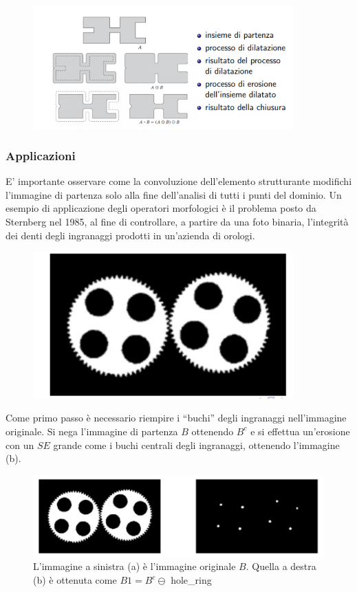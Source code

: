 \begin{figure}[H]
    \centering
    \includegraphics[width=10cm, keepaspectratio]{capitoli/immagini/imgs/chiusura_bella.png}
\end{figure}

\subsubsection{Applicazioni}

E' importante osservare come la convoluzione dell'elemento strutturante modifichi l'immagine di partenza solo alla fine
dell'analisi di tutti i punti del dominio. Un esempio di applicazione degli operatori morfologici è il problema posto da Sternberg nel 1985, al fine di controllare, a
partire da una foto binaria, l'integrità dei denti degli ingranaggi prodotti in un'azienda di orologi.

\begin{figure}[H]
    \centering
    \includegraphics[width=10cm, keepaspectratio]{capitoli/immagini/imgs/orologi-esempio.png}
\end{figure}

Come primo passo è necessario riempire i “buchi” degli ingranaggi nell'immagine originale.
Si nega l'immagine di partenza $B$ ottenendo $B^c$ e si effettua un'erosione
con un $SE$ grande come i buchi centrali degli ingranaggi, ottenendo
l'immagine (b).

\begin{figure}[H]
    \centering
    \includegraphics[width=\linewidth, keepaspectratio]{capitoli/immagini/imgs/orologi2.png}
    \caption{L'immagine a sinistra (a) è l'immagine originale $B$. Quella a destra (b) è ottenuta come $B1=B^c \ominus$ hole\_ring}
\end{figure}

